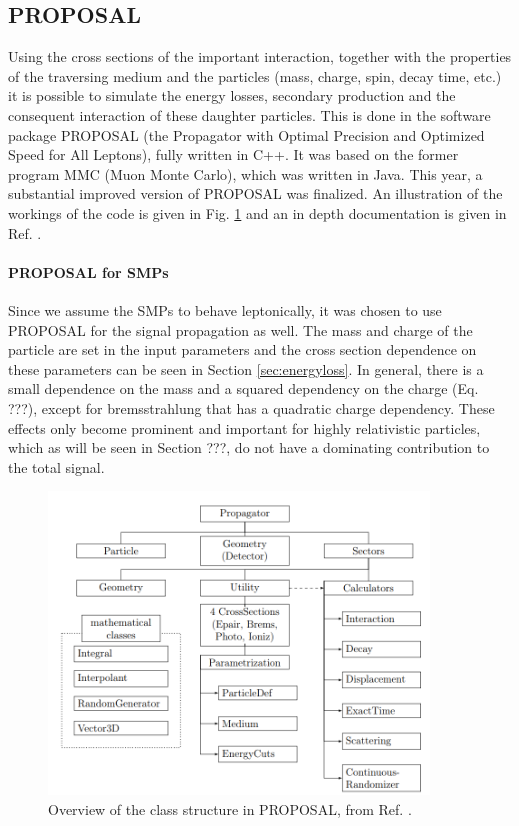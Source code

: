\subsection{PROPOSAL}
Using the cross sections of the important interaction, together with the properties of the traversing medium and the particles (mass, charge, spin, decay time, etc.) it is possible to simulate the energy losses, secondary production and the consequent interaction of these daughter particles. This is done in the software package PROPOSAL  (the Propagator with Optimal Precision and Optimized Speed for All Leptons), fully written in C++. It was based on the former program MMC (Muon Monte Carlo), which was written in Java. This year, a substantial improved version of PROPOSAL was finalized. An illustration of the workings of the code is given in Fig. \ref{fig:proposal} and an in depth documentation is given in Ref. \cite{Dunsch:2018nsc}.

\paragraph{PROPOSAL for SMPs}
Since we assume the SMPs to behave leptonically, it was chosen to use PROPOSAL for the signal propagation as well. The mass and charge of the particle are set in the input parameters and the cross section dependence on these parameters can be seen in Section \ref{sec:energyloss}. In general, there is a small dependence on the mass and a squared dependency on the charge (Eq. ???), except for bremsstrahlung that has a quadratic charge dependency. These effects only become prominent and important for highly relativistic particles, which as will be seen in Section ???, do not have a dominating contribution to the total signal.\\

\begin{figure}
\centering
\includegraphics[width=0.9\textwidth]{chapter6/img/proposal.png}
\caption{Overview of the class structure in PROPOSAL, from Ref. \cite{Dunsch:2018nsc}.}
\label{fig:proposal}
\end{figure}

